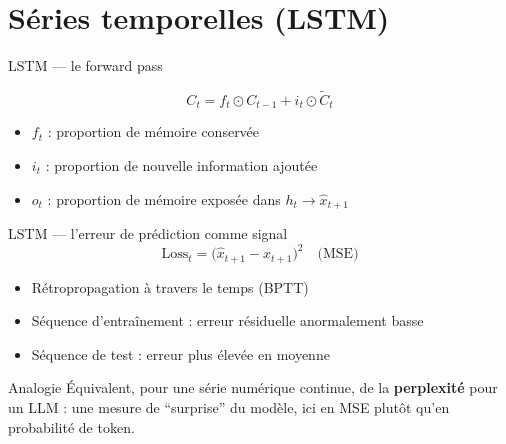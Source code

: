 \documentclass[11pt]{beamer}
\begin{document}
\section{Séries temporelles (LSTM)}

\begin{frame}{LSTM --- le forward pass}
  \begin{center}
  \end{center}
  \vspace{3mm}
  \[
    C_t = f_t \odot C_{t-1} + i_t \odot \tilde{C}_t
  \]
  \begin{itemize}
    \item $f_t$ : proportion de mémoire conservée
    \item $i_t$ : proportion de nouvelle information ajoutée
    \item $o_t$ : proportion de mémoire exposée dans $h_t \to \hat{x}_{t+1}$
  \end{itemize}
\end{frame}

\begin{frame}{LSTM --- l'erreur de prédiction comme signal}
  \[
    \text{Loss}_t = \big(\hat{x}_{t+1} - x_{t+1}\big)^2 \quad \text{(MSE)}
  \]
  \begin{itemize}
    \item Rétropropagation à travers le temps (BPTT)
    \item Séquence d'entraînement : erreur résiduelle anormalement basse
    \item Séquence de test : erreur plus élevée en moyenne
  \end{itemize}
  \begin{block}{Analogie}
    Équivalent, pour une série numérique continue, de la
    \textbf{perplexité} pour un LLM : une mesure de ``surprise''
    du modèle, ici en MSE plutôt qu'en probabilité de token.
  \end{block}
\end{frame}
\end{document}
